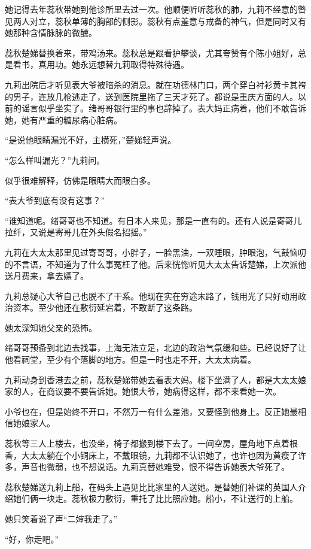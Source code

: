 \par 她记得去年蕊秋带她到他诊所里去过一次。他顺便听听蕊秋的肺，九莉不经意的瞥见两人对立，蕊秋单薄的胸部的侧影。蕊秋有点羞意与戒备的神气，但是同时又有她那种含情脉脉的微醺。
\par 蕊秋楚娣替换着来，带鸡汤来。蕊秋总是跟看护攀谈，尤其夸赞有个陈小姐好，总是看书，真用功。她永远想替九莉取得特殊待遇。
\par 九莉出院后才听见表大爷被暗杀的消息。就在功德林门口，两个穿白衬衫黄卡其袴的男子，连放几枪逃走了，送到医院里拖了三天才死了。都说是重庆方面的人。以前的谣言似乎坐实了。绪哥哥银行里的事也辞掉了。表大妈正病着，他们不敢告诉她，她有严重的糖尿病心脏病。
\par “是说他眼睛漏光不好，主横死，”楚娣轻声说。
\par “怎么样叫漏光？”九莉问。
\par 似乎很难解释，仿佛是眼睛大而眼白多。
\par “表大爷到底有没有这事？”
\par “谁知道呢。绪哥哥也不知道。有日本人来见，那是一直有的。还有人说是寄哥儿拉纤，又说是寄哥儿在外头假名招摇。”
\par 九莉在大太太那里见过寄哥哥，小胖子，一脸黑油，一双睡眼，肿眼泡，气鼓恼叨的不言语，不知道为了什么事冤枉了他。后来恍惚听见大太太告诉楚娣，上次派他送月费来，拿去嫖了。
\par 九莉总疑心大爷自己也脱不了干系。他现在实在穷途末路了，钱用光了只好动用政治资本。至少他还在敷衍延宕着，不敢断了这条路。
\par 她太深知她父亲的恐怖。
\par 绪哥哥预备到北边去找事，上海无法立足，北边的政治气氛缓和些。已经说好了让他看祠堂，至少有个落脚的地方。但是一时也走不开，大太太病着。
\par 九莉动身到香港去之前，蕊秋楚娣带她去看表大妈。楼下坐满了人，都是大太太娘家的人，在商议要不要告诉她。她恨大爷，她病得这样，都不来看她一次。
\par 小爷也在，但是始终不开口，不然万一有什么差池，又要怪到他身上。反正她最相信她娘家人。
\par 蕊秋等三人上楼去，也没坐，椅子都搬到楼下去了。一间空房，屋角地下点着根香，大太太躺在个小铜床上，不戴眼镜，九莉都不认识她了，也许也因为黄瘦了许多，声音也微弱，也不想说话。九莉真替她难受，恨不得告诉她表大爷死了。
\par 蕊秋楚娣送九莉上船，在码头上遇见比比家里的人送她。是替她们补课的英国人介绍她们俩一块走。蕊秋极力敷衍，重托了比比照应她。船小，不让送行的上船。
\par 她只笑着说了声“二婶我走了。”
\par “好，你走吧。”
